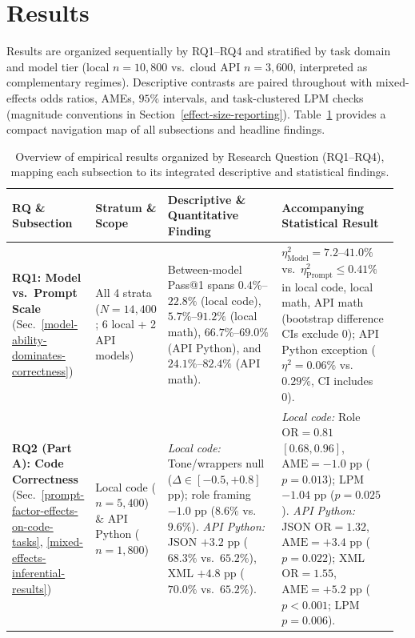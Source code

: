 \documentclass[a4paper,fleqn]{cas-sc}
\begin{document}
\section{Results}\label{sec:results}

Results are organized sequentially by RQ1--RQ4 and stratified by task domain and model tier (local $n = 10{,}800$ vs.\ cloud API $n = 3{,}600$, interpreted as complementary regimes). Descriptive contrasts are paired throughout with mixed-effects odds ratios, AMEs, $95\%$ intervals, and task-clustered LPM checks (magnitude conventions in Section~\ref{effect-size-reporting}). Table~\ref{tab:key-findings} provides a compact navigation map of all subsections and headline findings.

\begin{table}[htbp]
\centering
\caption{Overview of empirical results organized by Research Question (RQ1--RQ4), mapping each subsection to its integrated descriptive and statistical findings.}\label{tab:key-findings}
\footnotesize
\setlength{\tabcolsep}{4pt}
\begin{tabular}{@{}p{0.15\linewidth}p{0.18\linewidth}p{0.31\linewidth}p{0.32\linewidth}@{}}
\toprule
\textbf{RQ \& Subsection} & \textbf{Stratum \& Scope} & \textbf{Descriptive \& Quantitative Finding} & \textbf{Accompanying Statistical Result} \\
\midrule
\textbf{RQ1: Model vs.\ Prompt Scale} \newline (Sec.~\ref{model-ability-dominates-correctness}) & All 4 strata ($N = 14,400$; 6 local + 2 API models) & Between-model Pass@1 spans $0.4\%$--$22.8\%$ (local code), $5.7\%$--$91.2\%$ (local math), $66.7\%$--$69.0\%$ (API Python), and $24.1\%$--$82.4\%$ (API math). & $\eta^2_{\text{Model}} = 7.2$--$41.0\%$ vs.\ $\eta^2_{\text{Prompt}} \le 0.41\%$ in local code, local math, API math (bootstrap difference CIs exclude 0); API Python exception ($\eta^2 = 0.06\%$ vs.\ $0.29\%$, CI includes 0). \\
\addlinespace[3pt]
\textbf{RQ2 (Part A): Code Correctness} \newline (Sec.~\ref{prompt-factor-effects-on-code-tasks}, \ref{mixed-effects-inferential-results}) & Local code ($n = 5,400$) \& API Python ($n = 1,800$) & \emph{Local code:} Tone/wrappers null ($\Delta \in [-0.5, +0.8]$ pp); role framing $-1.0$ pp ($8.6\%$ vs.\ $9.6\%$). \newline \emph{API Python:} JSON $+3.2$ pp ($68.3\%$ vs.\ $65.2\%$), XML $+4.8$ pp ($70.0\%$ vs.\ $65.2\%$). & \emph{Local code:} Role $\text{OR} = 0.81$ $[0.68, 0.96]$, $\text{AME} = -1.0$ pp ($p = 0.013$); LPM $-1.04$ pp ($p = 0.025$). \newline \emph{API Python:} JSON $\text{OR} = 1.32$, $\text{AME} = +3.4$ pp ($p = 0.022$); XML $\text{OR} = 1.55$, $\text{AME} = +5.2$ pp ($p < 0.001$; LPM $p = 0.006$). \\

\end{tabular}
\end{table}
\end{document}
